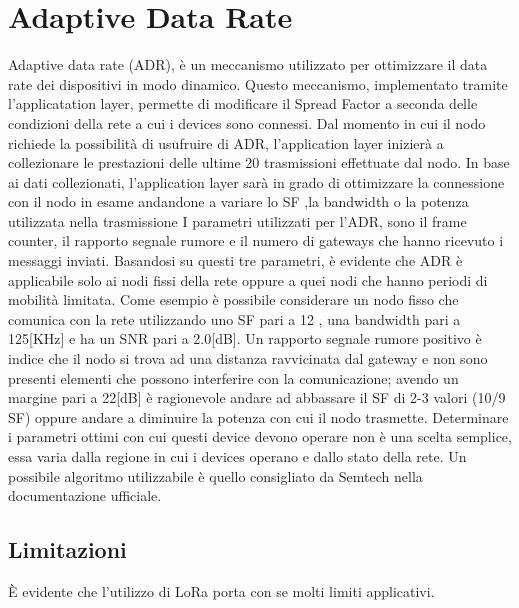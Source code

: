 \section{Adaptive Data Rate}
Adaptive data rate (ADR), è un meccanismo utilizzato per ottimizzare il data
rate dei dispositivi in modo dinamico. Questo meccanismo, implementato tramite
l'applicatation layer, permette di modificare il Spread Factor a seconda delle
condizioni della rete a cui i devices sono connessi. Dal momento in cui il nodo
richiede la possibilità di usufruire di ADR, l'application layer inizierà a
collezionare le prestazioni delle ultime 20 trasmissioni effettuate dal nodo.
In base ai dati collezionati, l'application layer sarà in grado di ottimizzare
la connessione con il nodo in esame andandone a variare lo SF ,la bandwidth o la
potenza utilizzata nella trasmissione I parametri utilizzati per l'ADR, 
sono il frame counter, il
rapporto segnale rumore e il numero di gateways che hanno ricevuto i messaggi
inviati.  Basandosi su questi tre parametri, è evidente che ADR è applicabile
solo ai nodi fissi della rete oppure a quei nodi che hanno periodi di mobilità
limitata.  Come esempio è possibile considerare un nodo fisso che comunica con
la rete utilizzando uno SF pari a 12 , una bandwidth pari a 125[KHz] e ha un SNR
pari a 2.0[dB]. Un rapporto segnale rumore positivo è indice che il nodo si
trova ad una distanza ravvicinata dal gateway e non sono presenti elementi che
possono interferire con la comunicazione; avendo un margine pari a 22[dB] è
ragionevole andare ad abbassare il SF di 2-3 valori (10/9 SF) oppure andare a
diminuire la potenza con cui il nodo trasmette. Determinare i parametri ottimi
con cui questi device devono operare non è una scelta semplice, essa varia dalla
regione in cui i devices operano e dallo stato della rete. Un possibile
algoritmo utilizzabile è quello consigliato da Semtech nella documentazione
ufficiale.
\subsection{Limitazioni}
È evidente che l'utilizzo di LoRa porta con se molti limiti applicativi. 

